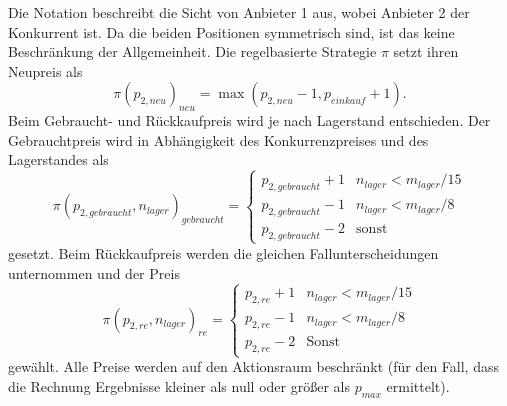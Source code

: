 Die Notation beschreibt die Sicht von Anbieter 1 aus, wobei Anbieter 2 der Konkurrent ist.
Da die beiden Positionen symmetrisch sind, ist das keine Beschränkung der Allgemeinheit.
Die regelbasierte Strategie $\pi$ setzt ihren Neupreis als
\begin{equation}
	\pi\left(p_{2, neu}\right)_{neu} = \max{\left(p_{2, neu} - 1, p_{einkauf} + 1\right)}.
\end{equation}
Beim Gebraucht- und Rückkaufpreis wird je nach Lagerstand entschieden.
Der Gebrauchtpreis wird in Abhängigkeit des Konkurrenzpreises und des Lagerstandes als
\begin{equation}
	\pi\left(p_{2, gebraucht}, n_{lager}\right)_{gebraucht} =
	\begin{cases}
		p_{2, gebraucht} + 1 & n_{lager} < m_{lager} / 15\\
		p_{2, gebraucht} - 1 & n_{lager} < m_{lager} / 8\\
		p_{2, gebraucht} - 2 & \text{sonst}
	\end{cases}
\end{equation}
gesetzt.
Beim Rückkaufpreis werden die gleichen Fallunterscheidungen unternommen und der Preis
\begin{equation}
	\pi(p_{2, re}, n_{lager})_{re} =
	\begin{cases}
		p_{2, re} + 1 & n_{lager} < m_{lager} / 15\\
		p_{2, re} - 1 & n_{lager} < m_{lager} / 8\\
		p_{2, re} - 2 & \text{Sonst}
	\end{cases}
\end{equation}
gewählt.
Alle Preise werden auf den Aktionsraum beschränkt (für den Fall, dass die Rechnung Ergebnisse kleiner als null oder größer als $p_{max}$ ermittelt).
\clearpage
{}
